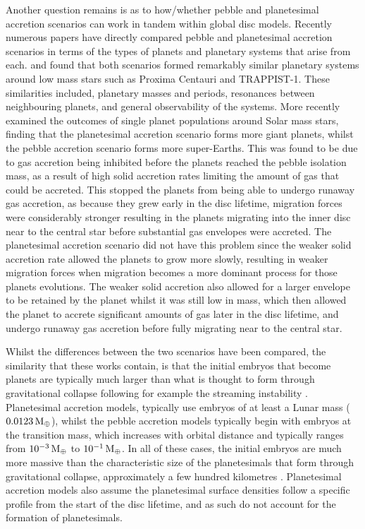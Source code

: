 \documentclass[a4paper,fleqn,usenatbib]{mnras}
\newcommand{\me}{{\, {\rm M}_{\oplus}}}
\begin{document}
Another question remains is as to how/whether pebble and planetesimal accretion scenarios can work in tandem within global disc models.
Recently numerous papers have directly compared pebble and planetesimal accretion scenarios in terms of the types of planets and planetary systems that arise from each.
\citet{ColemanProxima17} and \citet{Coleman19} found that both scenarios formed remarkably similar planetary systems around low mass stars such as Proxima Centauri and TRAPPIST-1.
These similarities included, planetary masses and periods, resonances between neighbouring planets, and general observability of the systems.
More recently \citet{Brugger20} examined the outcomes of single planet populations around Solar mass stars, finding that the planetesimal accretion scenario forms more giant planets, whilst the pebble accretion scenario forms more super-Earths.
This was found to be due to gas accretion being inhibited before the planets reached the pebble isolation mass, as a result of high solid accretion rates limiting the amount of gas that could be accreted.
This stopped the planets from being able to undergo runaway gas accretion, as because they grew early in the disc lifetime, migration forces were considerably stronger resulting in the planets migrating into the inner disc near to the central star before substantial gas envelopes were accreted.
The planetesimal accretion scenario did not have this problem since the weaker solid accretion rate allowed the planets to grow more slowly, resulting in weaker migration forces when migration becomes a more dominant process for those planets evolutions. The weaker solid accretion also allowed for a larger envelope to be retained by the planet whilst it was still low in mass, which then allowed the planet to accrete significant amounts of gas later in the disc lifetime, and undergo runaway gas accretion before fully migrating near to the central star.

Whilst the differences between the two scenarios have been compared, the similarity that these works contain, is that the initial embryos that become planets are typically much larger than what is thought to form through gravitational collapse following for example the streaming instability \citep{Johansen07}.
Planetesimal accretion models, typically use embryos of at least a Lunar mass ($0.0123\me$), whilst the pebble accretion models typically begin with embryos at the transition mass, which increases with orbital distance and typically ranges from $10^{-3} \me$ to $10^{-1} \me$.
In all of these cases, the initial embryos are much more massive than the characteristic size of the planetesimals that form through gravitational collapse, approximately a few hundred kilometres \citep{Johansen12,Johansen15,Simon16,Schafer17,Simon17,Abod19}.
Planetesimal accretion models also assume the planetesimal surface densities follow a specific profile from the start of the disc lifetime, and as such do not account for the formation of planetesimals.
\end{document}
